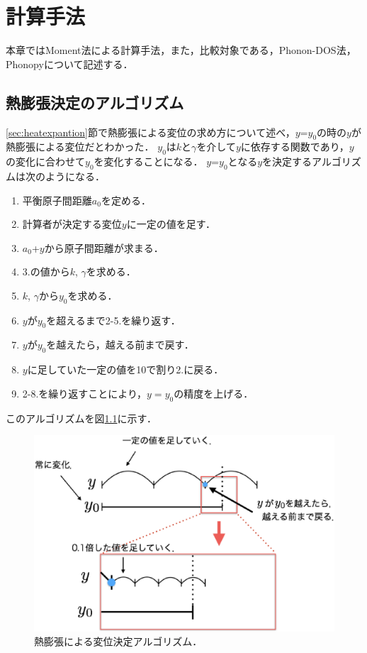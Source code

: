 \chapter{計算手法}
本章ではMoment法による計算手法，また，比較対象である，Phonon-DOS法，Phonopyについて記述する．

\section{熱膨張決定のアルゴリズム}
\ref{sec:heatexpantion}節で熱膨張による変位の求め方について述べ，$y$=$y_0$の時の$y$が熱膨張による変位だとわかった．
$y_0$は$k$と$\gamma$を介して$y$に依存する関数であり，$y$の変化に合わせて$y_0$を変化することになる．
$y$=$y_0$となる$y$を決定するアルゴリズムは次のようになる．
\begin{enumerate}
 \item 平衡原子間距離$a_0$を定める．
 \item 計算者が決定する変位$y$に一定の値を足す．
 \item $a_0$+$y$から原子間距離が求まる．
 \item 3.の値から$k$, $\gamma$を求める．
 \item $k$, $\gamma$から$y_0$を求める．
 \item $y$が$y_0$を超えるまで2-5.を繰り返す．
 \item $y$が$y_0$を越えたら，越える前まで戻す．
 \item $y$に足していた一定の値を10で割り2.に戻る．
 \item 2-8.を繰り返すことにより，$y=y_0$の精度を上げる．
\end{enumerate}
このアルゴリズムを図\ref{fig:algo}に示す．
\begin{figure}[htbp]
 \begin{center}
  \includegraphics[width=130mm]{../image/fig2.eps}
 \end{center}
 \caption{熱膨張による変位決定アルゴリズム．}
 \label{fig:algo}
\end{figure}

